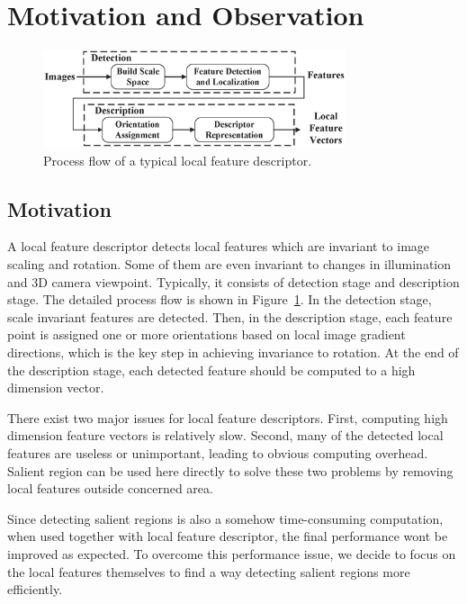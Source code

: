\section{Motivation and Observation}
\label{sec:observation}

\begin{figure}
	\centering
	\includegraphics[width=3.5in]{images/fig-workflow.eps}
	\caption{Process flow of a typical local feature descriptor.}
	\label{fig:workflow}
\end{figure}

\subsection{Motivation}

A local feature descriptor detects local features which are invariant to image scaling and rotation. Some of them are even invariant to changes in illumination and 3D camera viewpoint. Typically, it consists of detection stage and description stage. The detailed process flow is shown in Figure~\ref{fig:workflow}. In the detection stage, scale invariant features are detected. Then, in the description stage, each feature point is assigned one or more orientations based on local image gradient directions, which is the key step in achieving invariance to rotation. At the end of the description stage, each detected feature should be computed to a high dimension vector.

There exist two major issues for local feature descriptors. First, computing high dimension feature vectors is relatively slow. Second, many of the detected local features are useless or unimportant, leading to obvious computing overhead. Salient region can be used here directly to solve these two problems by removing local features outside concerned area.~\cite{huang2009image,liang2010salient}

Since detecting salient regions is also a somehow time-consuming computation, when used together with local feature descriptor, the final performance wont be improved as expected. To overcome this performance issue, we decide to focus on the local features themselves to find a way detecting salient regions more efficiently. 

